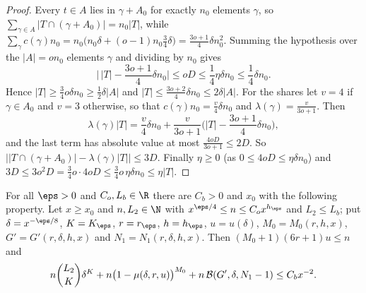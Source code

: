 \begin{proof}
Every $t\in A$ lies in $\gamma+A_0$ for exactly $n_0$ elements $\gamma$, so $\sum_{\gamma\in A}|T\cap(\gamma+A_0)|=n_0|T|$, while
$\sum_\gamma c(\gamma)n_0=n_0\big(n_0\delta+(o-1)n_0\frac34\delta\big)=\frac{3o+1}4\delta n_0^2$. Summing the hypothesis over
the $|A|=on_0$ elements $\gamma$ and dividing by $n_0$ gives
\[
\Big|\,|T|-\frac{3o+1}4\delta n_0\Big|\le oD\le\frac14\eta\delta n_0\le\frac14\delta n_0 .
\]
Hence $|T|\ge\frac34o\delta n_0\ge\frac12\delta|A|$ and $|T|\le\frac{3o+2}4\delta n_0\le2\delta|A|$. For the shares let
$v=4$ if $\gamma\in A_0$ and $v=3$ otherwise, so that $c(\gamma)n_0=\frac v4\delta n_0$ and $\lambda(\gamma)=\frac v{3o+1}$.
Then
\[
\lambda(\gamma)|T|=\frac v4\delta n_0+\frac v{3o+1}\Big(|T|-\frac{3o+1}4\delta n_0\Big),
\]
and the last term has absolute value at most $\frac{4oD}{3o+1}\le2D$. So
$\big||T\cap(\gamma+A_0)|-\lambda(\gamma)|T|\big|\le3D$. Finally $\eta\ge0$ (as $0\le4oD\le\eta\delta n_0$) and
$3D\le3o^2D=\frac34o\cdot4oD\le\frac34o\,\eta\delta n_0\le\eta|T|$.
\end{proof}

\begin{lemma}\label{pf:top-supply:orbitterms}
For all $\eps>0$ and $C_o,L_b\in\R$ there are $C_b>0$ and $x_0$ with the following property. Let $x\ge x_0$ and
$n,L_2\in\N$ with $x^{\eps/4}\le n\le C_ox^{h_\eps}$ and $L_2\le L_b$; put $\delta=x^{-\eps/8}$, $K=K_\eps$, $r=r_\eps$,
$h=h_\eps$, $u=u(\delta)$, $M_0=M_0(r,h,x)$, $G'=G'(r,\delta,h,x)$ and $N_1=N_1(r,\delta,h,x)$. Then $(M_0+1)(6r+1)u\le n$
and
\[
n\binom{L_2}K\delta^K+n\big(1-\mu(\delta,r,u)\big)^{M_0}+n\,\mathcal{B}(G',\delta,N_1-1)\le C_bx^{-2}.
\]
\end{lemma}

